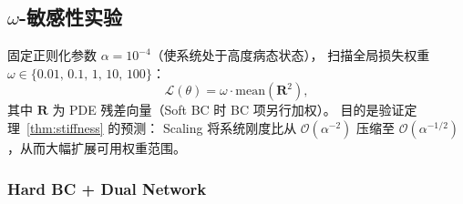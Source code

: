 \subsection{$\omega$-敏感性实验}
\label{subsec:omega-test}

固定正则化参数 $\alpha = 10^{-4}$（使系统处于高度病态状态），
扫描全局损失权重 $\omega \in \{0.01,\,0.1,\,1,\,10,\,100\}$：
\[
  \mathcal{L}(\theta) = \omega \cdot \mathrm{mean}(\mathbf{R}^2),
\]
其中 $\mathbf{R}$ 为 PDE 残差向量（Soft BC 时 BC 项另行加权）。
目的是验证定理~\ref{thm:stiffness} 的预测：
Scaling 将系统刚度比从 $\mathcal{O}(\alpha^{-2})$ 压缩至
$\mathcal{O}(\alpha^{-1/2})$，从而大幅扩展可用权重范围。


\subsubsection{Hard BC + Dual Network}

